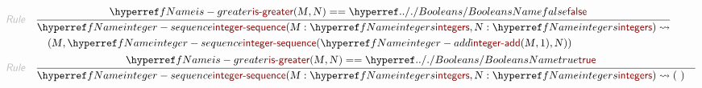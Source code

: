 \begin{align*}
  \KEY{Rule} \quad
    & \RULE{
      & \NAMEREF{is-greater}
          (  \VAR{M}, 
                 \VAR{N} ) 
        == \NAMEHYPER{../.}{Booleans}{false}
      }{
      & \NAMEREF{integer-sequence}
          (  \VAR{M} : \NAMEREF{integers}, 
                 \VAR{N} : \NAMEREF{integers} ) \leadsto \\&\quad
          (  \VAR{M}, 
                 \NAMEREF{integer-sequence}
                  (  \NAMEREF{integer-add}
                          (  \VAR{M}, 
                                 1 ), 
                         \VAR{N} ) )
      }
\\
  \KEY{Rule} \quad
    & \RULE{
      & \NAMEREF{is-greater}
          (  \VAR{M}, 
                 \VAR{N} ) 
        == \NAMEHYPER{../.}{Booleans}{true}
      }{
      & \NAMEREF{integer-sequence}
          (  \VAR{M} : \NAMEREF{integers}, 
                 \VAR{N} : \NAMEREF{integers} ) \leadsto 
          (   \  )
      }
\end{align*}


